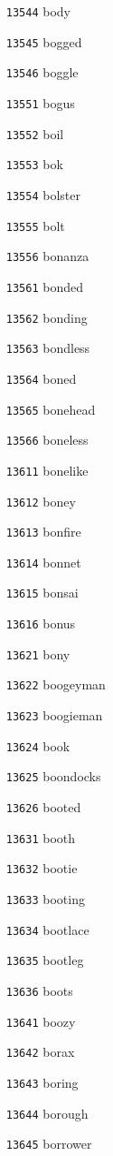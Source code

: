\documentclass[twoside,11pt]{article}
\begin{document}
\begin{multicols}{5}
\begin{enumerate}
\item[\texttt{13544}] body
\item[\texttt{13545}] bogged
\item[\texttt{13546}] boggle
\item[\texttt{13551}] bogus
\item[\texttt{13552}] boil
\item[\texttt{13553}] bok
\item[\texttt{13554}] bolster
\item[\texttt{13555}] bolt
\item[\texttt{13556}] bonanza
\item[\texttt{13561}] bonded
\item[\texttt{13562}] bonding
\item[\texttt{13563}] bondless
\item[\texttt{13564}] boned
\item[\texttt{13565}] bonehead
\item[\texttt{13566}] boneless
\item[\texttt{13611}] bonelike
\item[\texttt{13612}] boney
\item[\texttt{13613}] bonfire
\item[\texttt{13614}] bonnet
\item[\texttt{13615}] bonsai
\item[\texttt{13616}] bonus
\item[\texttt{13621}] bony
\item[\texttt{13622}] boogeyman
\item[\texttt{13623}] boogieman
\item[\texttt{13624}] book
\item[\texttt{13625}] boondocks
\item[\texttt{13626}] booted
\item[\texttt{13631}] booth
\item[\texttt{13632}] bootie
\item[\texttt{13633}] booting
\item[\texttt{13634}] bootlace
\item[\texttt{13635}] bootleg
\item[\texttt{13636}] boots
\item[\texttt{13641}] boozy
\item[\texttt{13642}] borax
\item[\texttt{13643}] boring
\item[\texttt{13644}] borough
\item[\texttt{13645}] borrower

\end{enumerate}
\end{multicols}
\end{document}
